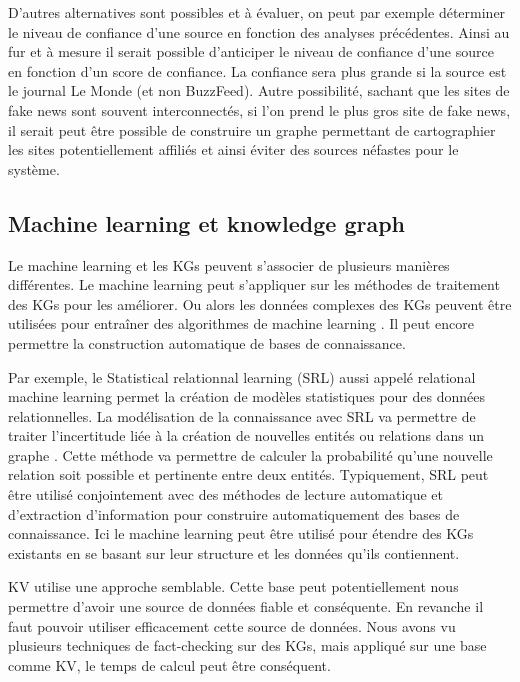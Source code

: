 D'autres alternatives sont possibles et à évaluer, on peut par exemple déterminer le niveau de confiance d'une source en fonction des analyses précédentes. Ainsi au fur et à mesure il serait possible d'anticiper le niveau de confiance d'une source en fonction d'un score de confiance. La confiance sera plus grande si la source est le journal Le Monde (et non BuzzFeed). Autre possibilité, sachant que les sites de fake news sont souvent interconnectés, si l'on prend le plus gros site de fake news, il serait peut être possible de construire un graphe permettant de cartographier les sites potentiellement affiliés et ainsi éviter des sources néfastes pour le système.

\subsection{Machine learning et knowledge graph}

Le machine learning et les KGs peuvent s'associer de plusieurs manières différentes. Le machine learning peut s'appliquer sur les méthodes de traitement des KGs pour les améliorer. Ou alors les données complexes des KGs peuvent être utilisées pour entraîner des algorithmes de machine learning \cite{wilcke2017knowledge}. Il peut encore permettre la construction automatique de bases de connaissance.

Par exemple, le Statistical relationnal learning (SRL) aussi appelé relational machine learning permet la création de modèles statistiques pour des données relationnelles. La modélisation de la connaissance avec SRL va permettre de traiter l'incertitude liée à la création de nouvelles entités ou relations dans un graphe \cite{nickel2016review}. Cette méthode va permettre de calculer la probabilité qu'une nouvelle relation soit possible et pertinente entre deux entités. Typiquement, SRL peut être utilisé conjointement avec des méthodes de lecture automatique et d'extraction d'information pour construire automatiquement des bases de connaissance. Ici le machine learning peut être utilisé pour étendre des KGs existants en se basant sur leur structure et les données qu'ils contiennent.

KV utilise une approche semblable. Cette base peut potentiellement nous permettre d'avoir une source de données fiable et conséquente. En revanche il faut pouvoir utiliser efficacement cette source de données. Nous avons vu plusieurs techniques de fact-checking sur des KGs, mais appliqué sur une base comme KV, le temps de calcul peut être conséquent.

